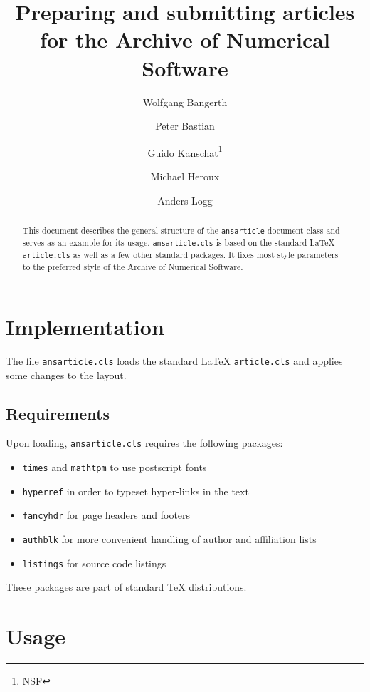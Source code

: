 \documentclass{ansarticle}
\title{Preparing and submitting articles for the Archive of Numerical
  Software}
\author[1]{Wolfgang Bangerth}
\author[2]{Peter Bastian}
\author[1]{Guido Kanschat\thanks{NSF}}
\author[3]{Michael Heroux}
\author[4]{Anders Logg}
\affil[1]{Department of Mathematics, Texas A\&M University}
\affil[2]{IWR, Universit\"at Heidelberg}
\affil[3]{Sandia National Laboratories}
\affil[4]{Simula, Oslo}
\begin{document}
\maketitle
\begin{abstract}
  This document describes the general structure of the
  \texttt{ansarticle} document class and serves as an example for its
  usage. \texttt{ansarticle.cls} is based on the standard \LaTeX{}
  \texttt{article.cls} as well as a few other standard packages. It
  fixes most style parameters to the preferred style of the Archive of
  Numerical Software.
\end{abstract}
\section{Implementation}
The file \texttt{ansarticle.cls} loads the standard LaTeX
\texttt{article.cls} and applies some changes to the layout.
\subsection{Requirements}
Upon loading, \texttt{ansarticle.cls} requires the following packages:
\begin{itemize}
\item \texttt{times} and \texttt{mathtpm} to use postscript fonts
\item \texttt{hyperref} in order to typeset hyper-links in the text
\item \texttt{fancyhdr} for page headers and footers
\item \texttt{authblk} for more convenient handling of author and
  affiliation lists
\item \texttt{listings} for source code listings
\end{itemize}
These packages are part of standard \TeX{} distributions.
\section{Usage}
\end{document}
